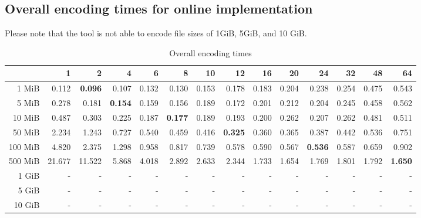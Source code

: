 \subsection{Overall encoding times for online implementation \cite{HuffmanCodingMPICUDA}}

Please note that the tool is not able to encode file sizes of 1GiB, 5GiB, and 10 GiB.

\begin{table}[!h]
	\centering
	\caption{Overall encoding times}
	\begin{tabular}{rrrrrrrrrrrrrr}
		\toprule
		\diagbox[width=7em]{Size}{Processes} & 1 & 2 & 4 & 6 & 8 & 10 & 12 & 16 & 20 & 24 & 32 & 48 & 64 \\
        \midrule
        1 MiB & 0.112 & \textbf{0.096} & 0.107 & 0.132 & 0.130 & 0.153 & 0.178 & 0.183 & 0.204 & 0.238 & 0.254 & 0.475 & 0.543 \\ 
        5 MiB & 0.278 & 0.181 & \textbf{0.154} & 0.159 & 0.156 & 0.189 & 0.172 & 0.201 & 0.212 & 0.204 & 0.245 & 0.458 & 0.562 \\ 
        10 MiB & 0.487 & 0.303 & 0.225 & 0.187 & \textbf{0.177} & 0.189 & 0.193 & 0.200 & 0.262 & 0.207 & 0.262 & 0.481 & 0.511 \\ 
        50 MiB & 2.234 & 1.243 & 0.727 & 0.540 & 0.459 & 0.416 & \textbf{0.325} & 0.360 & 0.365 & 0.387 & 0.442 & 0.536 & 0.751 \\ 
        100 MiB & 4.820 & 2.375 & 1.298 & 0.958 & 0.817 & 0.739 & 0.578 & 0.590 & 0.567 & \textbf{0.536} & 0.587 & 0.659 & 0.902 \\ 
        500 MiB & 21.677 & 11.522 & 5.868 & 4.018 & 2.892 & 2.633 & 2.344 & 1.733 & 1.654 & 1.769 & 1.801 & 1.792 & \textbf{1.650} \\
        1 GiB & - & - & - & - & - & - & - & - & - & - & - & - & - \\
        5 GiB & - & - & - & - & - & - & - & - & - & - & - & - & - \\
        10 GiB & - & - & - & - & - & - & - & - & - & - & - & - & - \\
		\bottomrule
	\end{tabular}
\end{table}

